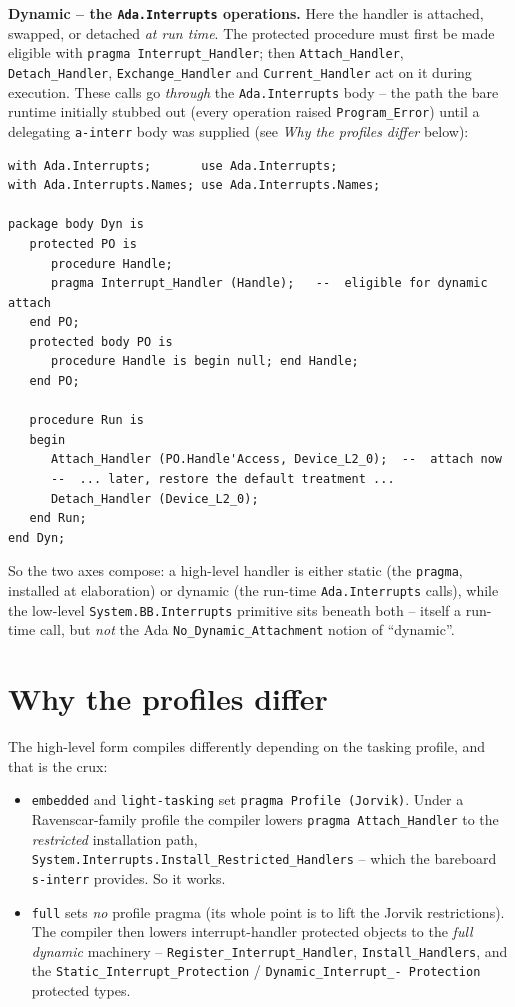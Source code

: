 \textbf{Dynamic -- the \texttt{Ada.Interrupts} operations.} Here the handler is
attached, swapped, or detached \emph{at run time}. The protected procedure must
first be made eligible with \texttt{pragma Interrupt\_Handler}; then
\texttt{Attach\_Handler}, \texttt{Detach\_Handler}, \texttt{Exchange\_Handler} and
\texttt{Current\_Handler} act on it during execution. These calls go \emph{through}
the \texttt{Ada.Interrupts} body -- the path the bare runtime initially stubbed
out (every operation raised \texttt{Program\_Error}) until a delegating
\texttt{a-interr} body was supplied (see \emph{Why the profiles differ} below):

\begin{lstlisting}
with Ada.Interrupts;       use Ada.Interrupts;
with Ada.Interrupts.Names; use Ada.Interrupts.Names;

package body Dyn is
   protected PO is
      procedure Handle;
      pragma Interrupt_Handler (Handle);   --  eligible for dynamic attach
   end PO;
   protected body PO is
      procedure Handle is begin null; end Handle;
   end PO;

   procedure Run is
   begin
      Attach_Handler (PO.Handle'Access, Device_L2_0);  --  attach now
      --  ... later, restore the default treatment ...
      Detach_Handler (Device_L2_0);
   end Run;
end Dyn;
\end{lstlisting}

So the two axes compose: a high-level handler is either static (the \texttt{pragma},
installed at elaboration) or dynamic (the run-time \texttt{Ada.Interrupts} calls),
while the low-level \texttt{System.BB.Interrupts} primitive sits beneath both --
itself a run-time call, but \emph{not} the Ada \texttt{No\_Dynamic\_Attachment}
notion of ``dynamic''.

\section{Why the profiles differ}

The high-level form compiles differently depending on the tasking profile, and
that is the crux:

\begin{itemize}
  \item \texttt{embedded} and \texttt{light-tasking} set \texttt{pragma Profile
        (Jorvik)}. Under a Ravenscar-family profile the compiler lowers
        \texttt{pragma Attach\_Handler} to the \emph{restricted} installation path,
        \texttt{System.Interrupts.Install\_Restricted\_Handlers} -- which the
        bareboard \texttt{s-interr} provides. So it works.
  \item \texttt{full} sets \emph{no} profile pragma (its whole point is to lift
        the Jorvik restrictions). The compiler then lowers interrupt-handler
        protected objects to the \emph{full dynamic} machinery --
        \texttt{Register\_Interrupt\_Handler}, \texttt{Install\_Handlers}, and the
        \texttt{Static\_Interrupt\_Protection} / \texttt{Dynamic\_Interrupt\_-
        Protection} protected types.
\end{itemize}

